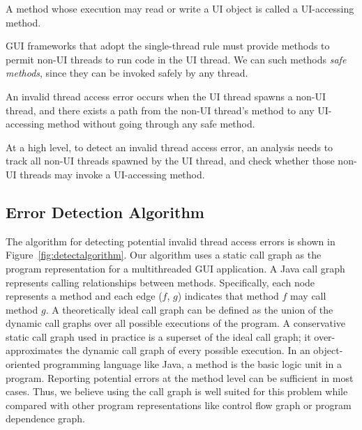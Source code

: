 { A method
whose execution may read or write a UI object is called a UI-accessing method.}\vspace{1mm}

 {GUI frameworks that
adopt the single-thread rule must provide methods to permit non-UI threads
to run code in the UI thread. We can such methods \textit{safe methods}, since
they can be invoked safely by any thread.}\vspace{1mm}

 {An invalid
thread access error occurs when the UI thread spawns a non-UI thread, and there
exists a path from the non-UI thread's  method to any UI-accessing method
without going through any safe method. }\vspace{2mm}

At a high level, to detect an invalid thread access error, an analysis needs to track all
non-UI threads spawned by the UI thread, and check whether those non-UI threads
may invoke a UI-accessing method.

\subsection{Error Detection Algorithm}

The algorithm for detecting potential invalid thread access errors
is shown in Figure~\ref{fig:detectalgorithm}. Our algorithm uses a
static call graph as the program representation for a multithreaded
GUI application. A Java call graph represents calling relationships
between methods. Specifically, each node represents a method and each
edge ($f$, $g$) indicates that method $f$ may call method $g$.
A theoretically ideal call graph can be defined as the union of the
dynamic call graphs over all possible executions of the program. 
A conservative static call graph used in practice is a superset of
the ideal call graph; it over-approximates the
dynamic call graph of every possible execution. 
In an object-oriented programming language like
Java, a method is the basic logic unit in a program. Reporting
potential errors at the method level can be sufficient in most cases.
Thus, we believe using the call graph is well suited for this problem while
compared with other program representations like control flow graph or
program dependence graph. 


